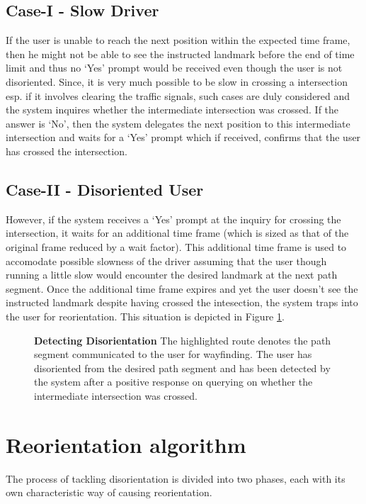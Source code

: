 \documentclass{iitkthesis}
\begin{document}
\subsection*{Case-I - Slow Driver}
If the user is unable to reach the next position within the expected time frame, then he might not be able to see the instructed landmark before the end of time limit and thus no `Yes' prompt would be received even though the user is not disoriented. Since, it is very much possible to be slow in crossing a intersection esp. if it involves clearing the traffic signals, such cases are duly considered and the system inquires whether the intermediate intersection was crossed. If the answer is `No', then the system delegates the next position to this intermediate intersection and waits for a `Yes' prompt which if received, confirms that the user has crossed the intersection. 

\subsection*{Case-II - Disoriented User}
However, if the system receives a `Yes' prompt at the inquiry for crossing the intersection, it waits for an additional time frame (which is sized as that of the original frame reduced by a wait factor). This additional time frame is used to accomodate possible slowness of the driver assuming that the user though running a little slow would encounter the desired landmark at the next path segment. Once the additional time frame expires and yet the user doesn't see the instructed landmark despite having crossed the intesection, the system traps into the user for reorientation. This situation is depicted in Figure \ref{fig:detect}. 
\begin{figure}
\centering
{}
\caption{\textbf{Detecting Disorientation} The highlighted route denotes the path segment communicated to the user for wayfinding. The user has disoriented from the desired path segment and has been detected by the system after a positive response on querying on whether the intermediate intersection was crossed.}
\label{fig:detect}
 \end{figure}
\section{Reorientation algorithm}
\label{sec:reorient}
The process of tackling disorientation is divided into two phases, each with its own characteristic way of causing reorientation. 
\end{document}
